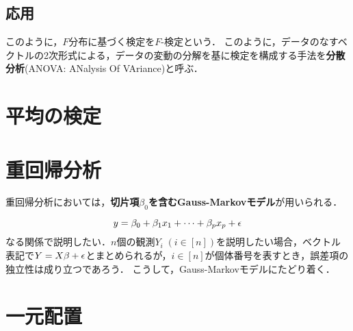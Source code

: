 \documentclass[uplatex,dvipdfmx]{jsreport}
\begin{document}
\begin{proposition}
    
\end{proposition}

\subsection{応用}

\begin{tcolorbox}[colframe=ForestGreen, colback=ForestGreen!10!white,breakable,colbacktitle=ForestGreen!40!white,coltitle=black,fonttitle=\bfseries\sffamily,
title=]
    このように，$F$分布に基づく検定を$F$-検定という．
    このように，データのなすベクトルの2次形式による，データの変動の分解を基に検定を構成する手法を\textbf{分散分析}(ANOVA: ANalysis Of VAriance)と呼ぶ．
\end{tcolorbox}

\section{平均の検定}

\section{重回帰分析}

\begin{tcolorbox}[colframe=ForestGreen, colback=ForestGreen!10!white,breakable,colbacktitle=ForestGreen!40!white,coltitle=black,fonttitle=\bfseries\sffamily,
title=]
    重回帰分析においては，\textbf{切片項$\beta_0$を含むGauss-Markovモデル}が用いられる．
\end{tcolorbox}

\begin{discussion}
    \[y=\beta_0+\beta_1x_1+\cdots+\beta_px_p+\epsilon\]
    なる関係で説明したい．$n$個の観測$Y_i\;(i\in[n])$を説明したい場合，ベクトル表記で$Y=X\beta+\epsilon$とまとめられるが，$i\in[n]$が個体番号を表すとき，誤差項の独立性は成り立つであろう．
    こうして，Gauss-Markovモデルにたどり着く．
\end{discussion}

\section{一元配置}

\begin{tcolorbox}[colframe=ForestGreen, colback=ForestGreen!10!white,breakable,colbacktitle=ForestGreen!40!white,coltitle=black,fonttitle=\bfseries\sffamily,
title=one-way ANOVA]
    
\end{tcolorbox}
\end{document}
